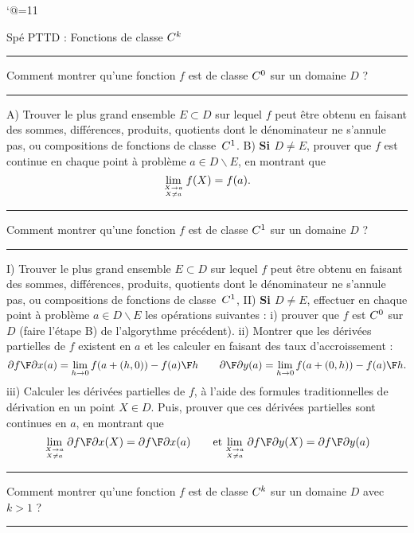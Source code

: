 \catcode`@=11\relax



\vglue-10mm\centerline{Spé PT\hfill TD : Fonctions de classe $\sc C^k$\hfill}
\bigskip

\hrule
\centerline{Comment montrer qu'une fonction $f$ est de classe $\sc C^0$ sur un domaine $D$ ?}
\hrule
\bigskip
\noindent
A) Trouver le plus grand ensemble $E\subset D$ sur lequel $f$ peut être obtenu en faisant des sommes, différences, produits, quotients dont le dénominateur ne s'annule pas, ou compositions de fonctions de classe~$\sc C^1$. 
\medskip
\noindent
B) {\bf Si $D\neq E$}, prouver que $f$ est continue en chaque point à problème $a\in D\smallsetminus E$, en montrant que  
$$
\lim_{X\to a\atop X\neq a}f(X)=f(a).
$$

\hrule
\centerline{Comment montrer qu'une fonction $f$ est de classe $\sc C^1$ sur un domaine $D$ ?}
\hrule

\bigskip\noindent
I) Trouver le plus grand ensemble $E\subset D$ sur lequel $f$ peut être obtenu en faisant des sommes, différences, produits, quotients dont le dénominateur ne s'annule pas, ou compositions de fonctions de classe~$\sc C^1$, 
\medskip\noindent
II) {\bf Si $D\neq E$}, effectuer en chaque point à problème $a\in D\smallsetminus E$ les opérations suivantes : \pn
i) prouver que $f$ est $\sc C^0$ sur $D$ (faire l'étape B) de l'algorythme précédent). \pn
ii) Montrer que les dérivées partielles de $f$ existent en $a$ et les calculer en faisant des taux d'accroissement :
$$
{\partial f\F\partial x}(a)=\lim_{h\to 0}{f(a+(h,0))-f(a)\F h}\qquad {\partial\F\partial y}(a)=\lim_{h\to 0}{f(a+(0,h))-f(a)\F h}. 
$$
iii) Calculer les dérivées partielles de $f$, à l'aide des formules traditionnelles de dérivation en un point $X\in D$. 
Puis, prouver que ces dérivées partielles sont continues en $a$, en montrant que  
$$
\lim_{X\to a\atop X\neq a}{\partial f\F\partial x}(X)={\partial f\F\partial x}(a)\qquad \hbox{et} \lim_{X\to a\atop X\neq a}{\partial f\F\partial y}(X)={\partial f\F\partial y}(a)
$$

\hrule
\centerline{Comment montrer qu'une fonction $f$ est de classe $\sc C^k$ sur un domaine $D$ avec $k>1$ ?}
\hrule

